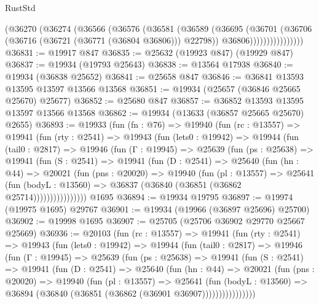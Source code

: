 \begin{lexlean}{RustStd}
\begin{coremodule}
                    (@36270
                      (@36274
                        (@36566
                          (@36576
                            (@36581
                              (@36589
                                (@36695
                                  (@36701
                                    (@36706 (@36716 (@36721 (@36771 (@36804 @36806))) @22798))
                                    @36806))))))))))))))))
@36831 := @19917 @847
@36835 := @25632 (@19923 @847) (@19929 @847)
@36837 := @19934 (@19793 @25643)
@36838 := @13564 @17938
@36840 := @19934 (@36838 @25652)
@36841 := @25658 @847
@36846 := @36841 @13593 @13595 @13597 @13566 @13568
@36851 := @19934 (@25657 (@36846 @25665 @25670) @25677)
@36852 := @25680 @847
@36857 := @36852 @13593 @13595 @13597 @13566 @13568
@36862 := @19934 (@13633 (@36857 @25665 @25670) @2655)
@36893 := @19933
    (fun (fn : @76) =>
    @19940
      (fun (rc : @13557) =>
      @19941
        (fun (rty : @2541) =>
        @19943
          (fun (lets0 : @19942) =>
          @19944
            (fun (tail0 : @2817) =>
            @19946
              (fun (Γ : @19945) =>
              @25639
                (fun (ps : @25638) =>
                @19941
                  (fun (S : @2541) =>
                  @19941
                    (fun (D : @2541) =>
                    @25640
                      (fun (hn : @44) =>
                      @20021
                        (fun (pns : @20020) =>
                        @19940
                          (fun (pl : @13557) =>
                          @25641
                            (fun (bodyL : @13560) =>
                            @36837 (@36840 (@36851 (@36862 @25714))))))))))))))))
    @1695
@36894 := @19934 @19795
@36897 := @19974 (@19975 @1695) @29767
@36901 := @19934 (@19966 (@36897 @25696) @25700)
@36902 := @19998 @1695
@36907 := @25705 (@25706 @36902 @29770 @25667 @25669)
@36936 := @20103
    (fun (rc : @13557) =>
    @19941
      (fun (rty : @2541) =>
      @19943
        (fun (lets0 : @19942) =>
        @19944
          (fun (tail0 : @2817) =>
          @19946
            (fun (Γ : @19945) =>
            @25639
              (fun (ps : @25638) =>
              @19941
                (fun (S : @2541) =>
                @19941
                  (fun (D : @2541) =>
                  @25640
                    (fun (hn : @44) =>
                    @20021
                      (fun (pns : @20020) =>
                      @19940
                        (fun (pl : @13557) =>
                        @25641
                          (fun (bodyL : @13560) =>
                          @36894 (@36840 (@36851 (@36862 (@36901 @36907))))))))))))))))

\end{coremodule}
\end{lexlean}
